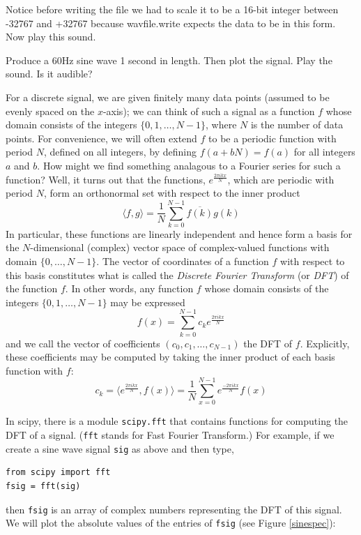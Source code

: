Notice before writing the file we had to scale it to be a 16-bit integer between -32767 and +32767 because wavfile.write expects the data to be in this form.  Now play this sound.

\begin{problem}
Produce a 60Hz sine wave 1 second in length. Then plot the signal. Play the sound. Is it audible?
\end{problem}


For a discrete signal, we are given finitely many data points (assumed to be evenly spaced on the $x$-axis); we can think of such a signal as a function $f$ whose domain consists of the integers $\{0,1,\dots,N-1\}$, where $N$ is the number of data points. For convenience, we will often extend $f$ to be a periodic function with period $N$, defined on all integers, by defining $f(a+bN)=f(a)$ for all integers $a$ and $b$. How might we find something analagous to a Fourier series for such a function? Well, it turns out that the functions, $e^{\frac{2\pi ikx}N}$, which are periodic with period $N$, form an orthonormal set with respect to the inner product
$$\langle f,g\rangle = \frac1N\sum_{k=0}^{N-1}\overline{f(k)}g(k)$$
In particular, these functions are linearly independent and hence form a basis for the $N$-dimensional (complex) vector space of complex-valued functions with domain $\{0,\dots,N-1\}$. The vector of coordinates of a function $f$ with respect to this basis constitutes what is called the \emph{Discrete Fourier Transform} (or \emph{DFT}) of the function $f$. In other words, any function $f$ whose domain consists of the integers $\{0,1,\dots,N-1\}$ may be expressed
$$f(x)=\sum_{k=0}^{N-1}c_ke^{\frac{2\pi ikx}N}$$
and we call the vector of coefficients $(c_0,c_1,\dots,c_{N-1})$ the DFT of $f$. Explicitly, these coefficients may be computed by taking the inner product of each basis function with $f$:
$$c_k=\langle e^{\frac{2\pi ikx}N}, f(x)\rangle=\frac1N\sum_{x=0}^{N-1}e^{\frac{-2\pi ikx}N}f(x)$$

In scipy, there is a module \texttt{scipy.fft} that contains functions for computing the DFT of a signal. (\texttt{fft} stands for Fast Fourier Transform.) For example, if we create a sine wave signal \texttt{sig} as above and then type,
\begin{lstlisting}
from scipy import fft
fsig = fft(sig)
\end{lstlisting}
then \texttt{fsig} is an array of complex numbers representing the DFT of this signal. We will plot the absolute values of the entries of \texttt{fsig} (see Figure \ref{sinespec}):


